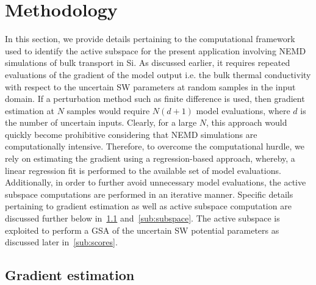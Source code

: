 \section{Methodology}
\label{sec:method}

In this section, we provide details pertaining to the computational framework used to identify
the active subspace for the present application involving NEMD simulations of bulk transport
in Si. As discussed earlier, it requires repeated evaluations of the gradient of the model output
i.e. the bulk thermal conductivity with respect to the uncertain SW parameters at random samples
in the input domain. If a perturbation method such as finite difference is used, then gradient
estimation at $N$ samples would require $N(d+1)$ model evaluations, where $d$ is the number
of uncertain inputs. Clearly, for a large $N$, this approach would quickly become prohibitive
considering that NEMD simulations are computationally intensive. Therefore, to overcome the
computational hurdle, we rely on estimating the gradient using a regression-based approach,
whereby, a linear regression fit is performed to the available set of model evaluations. Additionally, in order
to further avoid unnecessary model evaluations, the active subspace computations are performed
in an iterative manner. Specific details pertaining to gradient estimation as well as active
subspace computation are discussed further below in~\ref{sub:gradient} and~\ref{sub:subspace}. The
active subspace is exploited to perform a GSA of the uncertain SW potential parameters as discussed
later in~\ref{sub:scores}.

\subsection{Gradient estimation}
\label{sub:gradient} 

